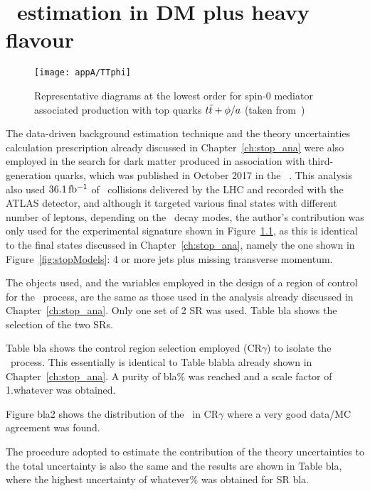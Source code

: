 \chapter{\ttZ\ estimation in DM plus heavy flavour}
\label{ch:appA}

	\begin{wrapfigure}{R}{.33\textwidth}
		\centering\texttt{[image: appA/TTphi]}
		\caption{Representative diagrams at the lowest order for spin-0 mediator associated production with top quarks $t\bar{t}+\phi/a$ (taken from~\cite{DMhf})}
		\label{fig:dmhfModels}
	\end{wrapfigure}

	The data-driven background estimation technique and the theory uncertainties calculation prescription already discussed in Chapter~\ref{ch:stop_ana} were also employed in the search for dark matter produced in association with third-generation quarks, which was published in October 2017 in the \EPJ~\cite{DMhf}. This analysis also used $36.1\, \mbox{fb$^{-1}$}$ of \pp\ collisions delivered by the \ac{LHC} and recorded with the \ac{ATLAS} detector, and although it targeted various final states with different number of leptons, depending on the \ttbar\ decay modes, the author's contribution was only used for the experimental signature shown in Figure~\ref{fig:dmhfModels}, as this is identical to the final states discussed in Chapter~\ref{ch:stop_ana}, namely the one shown in Figure~\ref{fig:stopModels}: 4 or more jets plus missing transverse momentum.

	The objects used, and the variables employed in the design of a region of control for the \ttgamma\ process, are the same as those used in the analysis already discussed in Chapter~\ref{ch:stop_ana}. Only one set of 2 \ac{SR} was used. Table bla shows the selection of the two \acp{SR}. 

	Table bla shows the control region selection employed (CR$\gamma$) to isolate the \ttgamma\ process. This essentially is identical to Table blabla already shown in Chapter~\ref{ch:stop_ana}. A purity of bla\% was reached and a scale factor of 1.whatever was obtained. 
	
	Figure bla2 shows the distribution of the \met\ in CR$\gamma$ where a very good data/MC agreement was found.
	
	The procedure adopted to estimate the contribution of the theory uncertainties to the total uncertainty is also the same and the results are shown in Table bla, where the highest uncertainty of whatever\% was obtained for SR bla. 
